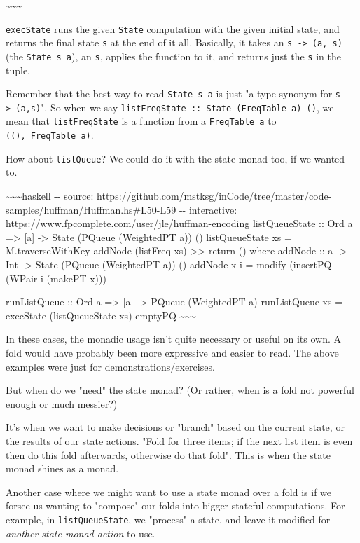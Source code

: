 \documentclass[]{article}
\begin{document}
\textasciitilde{}\textasciitilde{}\textasciitilde{}

\texttt{execState} runs the given \texttt{State} computation with the given
initial state, and returns the final state \texttt{s} at the end of it all.
Basically, it takes an \texttt{s\ -\textgreater{}\ (a,\ s)} (the
\texttt{State\ s\ a}), an \texttt{s}, applies the function to it, and returns
just the \texttt{s} in the tuple.

Remember that the best way to read \texttt{State\ s\ a} is just "a type synonym
for \texttt{s\ -\textgreater{}\ (a,s)}". So when we say
\texttt{listFreqState\ ::\ State\ (FreqTable\ a)\ ()}, we mean that
\texttt{listFreqState} is a function from a \texttt{FreqTable\ a} to
\texttt{((),\ FreqTable\ a)}.

How about \texttt{listQueue}? We could do it with the state monad too, if we
wanted to.

\textasciitilde{}\textasciitilde{}\textasciitilde{}haskell -\/- source:
https://github.com/mstksg/inCode/tree/master/code-samples/huffman/Huffman.hs\#L50-L59
-\/- interactive: https://www.fpcomplete.com/user/jle/huffman-encoding
listQueueState :: Ord a =\textgreater{} {[}a{]} -\textgreater{} State (PQueue
(WeightedPT a)) () listQueueState xs = M.traverseWithKey addNode (listFreq xs)
\textgreater{}\textgreater{} return () where addNode :: a -\textgreater{} Int
-\textgreater{} State (PQueue (WeightedPT a)) () addNode x i = modify (insertPQ
(WPair i (makePT x)))

runListQueue :: Ord a =\textgreater{} {[}a{]} -\textgreater{} PQueue (WeightedPT
a) runListQueue xs = execState (listQueueState xs) emptyPQ
\textasciitilde{}\textasciitilde{}\textasciitilde{}

In these cases, the monadic usage isn't quite necessary or useful on its own. A
fold would have probably been more expressive and easier to read. The above
examples were just for demonstrations/exercises.

But when do we "need" the state monad? (Or rather, when is a fold not powerful
enough or much messier?)

It's when we want to make decisions or "branch" based on the current state, or
the results of our state actions. "Fold for three items; if the next list item
is even then do this fold afterwards, otherwise do that fold". This is when the
state monad shines as a monad.

Another case where we might want to use a state monad over a fold is if we
forsee us wanting to "compose" our folds into bigger stateful computations. For
example, in \texttt{listQueueState}, we "process" a state, and leave it modified
for \emph{another state monad action} to use.
\end{document}
